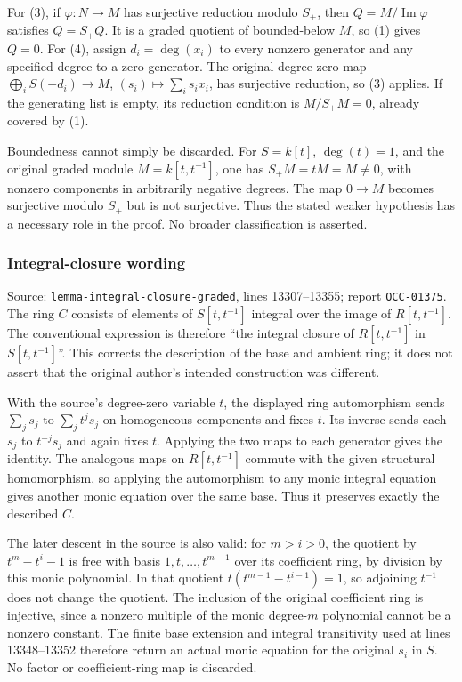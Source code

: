 For (3), if \(\varphi:N\to M\) has surjective reduction modulo \(S_+\), then \(Q=M/\operatorname{Im}\varphi\) satisfies \(Q=S_+Q\). It is a graded quotient of bounded-below \(M\), so (1) gives \(Q=0\). For (4), assign \(d_i=\deg(x_i)\) to every nonzero generator and any specified degree to a zero generator. The original degree-zero map \(\bigoplus_i S(-d_i)\to M\), \((s_i)\mapsto\sum_i s_i x_i\), has surjective reduction, so (3) applies. If the generating list is empty, its reduction condition is \(M/S_+M=0\), already covered by (1).

Boundedness cannot simply be discarded. For \(S=k[t]\), \(\deg(t)=1\), and the original graded module \(M=k[t,t^{-1}]\), one has \(S_+M=tM=M\ne0\), with nonzero components in arbitrarily negative degrees. The map \(0\to M\) becomes surjective modulo \(S_+\) but is not surjective. Thus the stated weaker hypothesis has a necessary role in the proof. No broader classification is asserted.

\subsubsection{Integral-closure wording}\label{algebra-proof-002-integral-closure-wording}

Source: \texttt{lemma-integral-closure-graded}, lines 13307--13355; report \texttt{OCC-01375}. The ring \(C\) consists of elements of \(S[t,t^{-1}]\) integral over the image of \(R[t,t^{-1}]\). The conventional expression is therefore ``the integral closure of \(R[t,t^{-1}]\) in \(S[t,t^{-1}]\)''. This corrects the description of the base and ambient ring; it does not assert that the original author's intended construction was different.

With the source's degree-zero variable \(t\), the displayed ring automorphism sends \(\sum_j s_j\) to \(\sum_j t^j s_j\) on homogeneous components and fixes \(t\). Its inverse sends each \(s_j\) to \(t^{-j}s_j\) and again fixes \(t\). Applying the two maps to each generator gives the identity. The analogous maps on \(R[t,t^{-1}]\) commute with the given structural homomorphism, so applying the automorphism to any monic integral equation gives another monic equation over the same base. Thus it preserves exactly the described \(C\).

The later descent in the source is also valid: for \(m>i>0\), the quotient by \(t^m-t^i-1\) is free with basis \(1,t,\ldots,t^{m-1}\) over its coefficient ring, by division by this monic polynomial. In that quotient \(t(t^{m-1}-t^{i-1})=1\), so adjoining \(t^{-1}\) does not change the quotient. The inclusion of the original coefficient ring is injective, since a nonzero multiple of the monic degree-\(m\) polynomial cannot be a nonzero constant. The finite base extension and integral transitivity used at lines 13348--13352 therefore return an actual monic equation for the original \(s_i\) in \(S\). No factor or coefficient-ring map is discarded.

